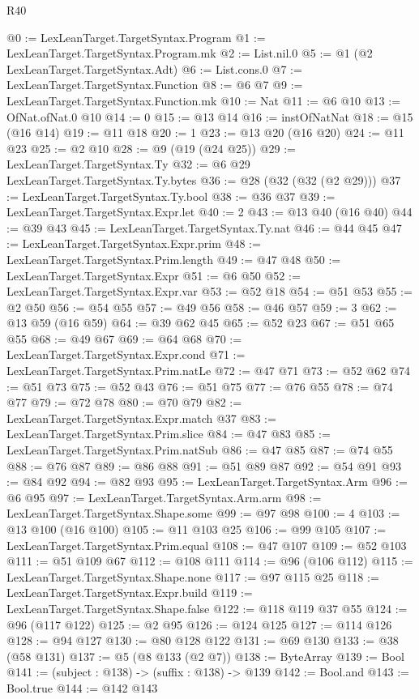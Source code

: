 \begin{lexlean}{R40}
\begin{coremodule}
@0 := LexLeanTarget.TargetSyntax.Program
@1 := LexLeanTarget.TargetSyntax.Program.mk
@2 := List.nil.{0}
@5 := @1 (@2 LexLeanTarget.TargetSyntax.Adt)
@6 := List.cons.{0}
@7 := LexLeanTarget.TargetSyntax.Function
@8 := @6 @7
@9 := LexLeanTarget.TargetSyntax.Function.mk
@10 := Nat
@11 := @6 @10
@13 := OfNat.ofNat.{0} @10
@14 := 0
@15 := @13 @14
@16 := instOfNatNat
@18 := @15 (@16 @14)
@19 := @11 @18
@20 := 1
@23 := @13 @20 (@16 @20)
@24 := @11 @23
@25 := @2 @10
@28 := @9 (@19 (@24 @25))
@29 := LexLeanTarget.TargetSyntax.Ty
@32 := @6 @29 LexLeanTarget.TargetSyntax.Ty.bytes
@36 := @28 (@32 (@32 (@2 @29)))
@37 := LexLeanTarget.TargetSyntax.Ty.bool
@38 := @36 @37
@39 := LexLeanTarget.TargetSyntax.Expr.let
@40 := 2
@43 := @13 @40 (@16 @40)
@44 := @39 @43
@45 := LexLeanTarget.TargetSyntax.Ty.nat
@46 := @44 @45
@47 := LexLeanTarget.TargetSyntax.Expr.prim
@48 := LexLeanTarget.TargetSyntax.Prim.length
@49 := @47 @48
@50 := LexLeanTarget.TargetSyntax.Expr
@51 := @6 @50
@52 := LexLeanTarget.TargetSyntax.Expr.var
@53 := @52 @18
@54 := @51 @53
@55 := @2 @50
@56 := @54 @55
@57 := @49 @56
@58 := @46 @57
@59 := 3
@62 := @13 @59 (@16 @59)
@64 := @39 @62 @45
@65 := @52 @23
@67 := @51 @65 @55
@68 := @49 @67
@69 := @64 @68
@70 := LexLeanTarget.TargetSyntax.Expr.cond
@71 := LexLeanTarget.TargetSyntax.Prim.natLe
@72 := @47 @71
@73 := @52 @62
@74 := @51 @73
@75 := @52 @43
@76 := @51 @75
@77 := @76 @55
@78 := @74 @77
@79 := @72 @78
@80 := @70 @79
@82 := LexLeanTarget.TargetSyntax.Expr.match @37
@83 := LexLeanTarget.TargetSyntax.Prim.slice
@84 := @47 @83
@85 := LexLeanTarget.TargetSyntax.Prim.natSub
@86 := @47 @85
@87 := @74 @55
@88 := @76 @87
@89 := @86 @88
@91 := @51 @89 @87
@92 := @54 @91
@93 := @84 @92
@94 := @82 @93
@95 := LexLeanTarget.TargetSyntax.Arm
@96 := @6 @95
@97 := LexLeanTarget.TargetSyntax.Arm.arm
@98 := LexLeanTarget.TargetSyntax.Shape.some
@99 := @97 @98
@100 := 4
@103 := @13 @100 (@16 @100)
@105 := @11 @103 @25
@106 := @99 @105
@107 := LexLeanTarget.TargetSyntax.Prim.equal
@108 := @47 @107
@109 := @52 @103
@111 := @51 @109 @67
@112 := @108 @111
@114 := @96 (@106 @112)
@115 := LexLeanTarget.TargetSyntax.Shape.none
@117 := @97 @115 @25
@118 := LexLeanTarget.TargetSyntax.Expr.build
@119 := LexLeanTarget.TargetSyntax.Shape.false
@122 := @118 @119 @37 @55
@124 := @96 (@117 @122)
@125 := @2 @95
@126 := @124 @125
@127 := @114 @126
@128 := @94 @127
@130 := @80 @128 @122
@131 := @69 @130
@133 := @38 (@58 @131)
@137 := @5 (@8 @133 (@2 @7))
@138 := ByteArray
@139 := Bool
@141 := (subject : @138) -> (suffix : @138) -> @139
@142 := Bool.and
@143 := Bool.true
@144 := @142 @143

\end{coremodule}
\end{lexlean}
